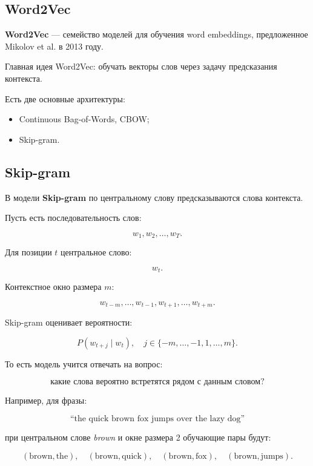 \documentclass[a4paper,12pt]{article}
\begin{document}
\subsection{Word2Vec}

\textbf{Word2Vec} --- семейство моделей для обучения word embeddings, предложенное Mikolov et al. в 2013 году.

Главная идея Word2Vec: обучать векторы слов через задачу предсказания контекста.

Есть две основные архитектуры:

\begin{itemize}
    \item Continuous Bag-of-Words, CBOW;
    \item Skip-gram.
\end{itemize}

\subsection{Skip-gram}

В модели \textbf{Skip-gram} по центральному слову предсказываются слова контекста.

Пусть есть последовательность слов:

\[
w_1, w_2, \dots, w_T.
\]

Для позиции \(t\) центральное слово:

\[
w_t.
\]

Контекстное окно размера \(m\):

\[
w_{t-m}, \dots, w_{t-1}, w_{t+1}, \dots, w_{t+m}.
\]

Skip-gram оценивает вероятности:

\[
P(w_{t+j} \mid w_t),
\quad
j \in \{-m,\dots,-1,1,\dots,m\}.
\]

То есть модель учится отвечать на вопрос:

\[
\text{какие слова вероятно встретятся рядом с данным словом?}
\]

Например, для фразы:

\[
\text{``the quick brown fox jumps over the lazy dog''}
\]

при центральном слове \textit{brown} и окне размера 2 обучающие пары будут:

\[
(\text{brown}, \text{the}),
\quad
(\text{brown}, \text{quick}),
\quad
(\text{brown}, \text{fox}),
\quad
(\text{brown}, \text{jumps}).
\]

%
\end{document}
